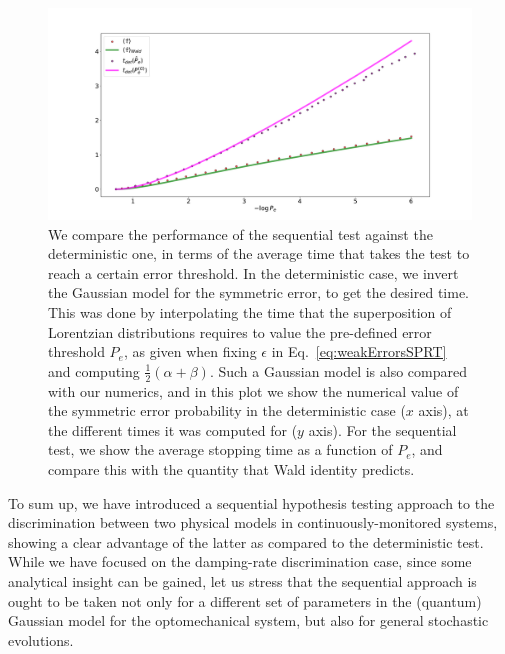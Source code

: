 \begin{figure}[t!]
    \centering
    \includegraphics[width=1.\textwidth]{Figures/CMON/damp-discri/temp/fig9.pdf}
    \caption{We compare the performance of the sequential test against the deterministic one, in terms of the average time that takes the test to reach a certain error threshold. In the deterministic case, we invert the Gaussian model for the symmetric error, to get the desired time. This was done by interpolating the time that the superposition of Lorentzian distributions requires to value the pre-defined error threshold $P_e$, as given when fixing $\epsilon$ in Eq.~\ref{eq:weakErrorsSPRT} and computing $\frac{1}{2}(\alpha + \beta)$. Such a Gaussian model is also compared with our numerics, and in this plot we show the numerical value of the symmetric error probability in the deterministic case ($x$ axis), at the different times it was computed for ($y$ axis). For the sequential test, we show the average stopping time as a function of $P_e$, and compare this with the quantity that Wald identity predicts.}
    \label{fig:comparison}
\end{figure}

To sum up, we have introduced a sequential hypothesis testing approach to the discrimination between two physical models in continuously-monitored systems, showing a clear advantage of the latter as compared to the deterministic test. While we have focused on the damping-rate discrimination case, since some analytical insight can be gained, let us stress that the sequential approach is ought to be taken not only for a different set of parameters in the (quantum) Gaussian model for the optomechanical system, but also for general stochastic evolutions.


